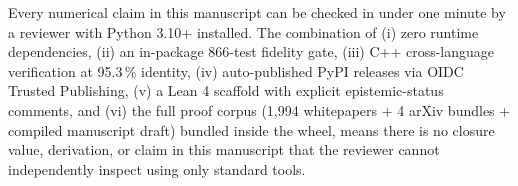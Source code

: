 Every numerical claim in this manuscript can be checked in under one
minute by a reviewer with Python 3.10+ installed. The combination of
(i) zero runtime dependencies, (ii) an in-package 866-test fidelity
gate, (iii) C++ cross-language verification at 95.3\,\% identity,
(iv) auto-published PyPI releases via OIDC Trusted Publishing,
(v) a Lean 4 scaffold with explicit epistemic-status comments, and
(vi) the full proof corpus (1{,}994 whitepapers + 4 arXiv bundles
+ compiled manuscript draft) bundled inside the wheel, means there
is no closure value, derivation, or claim in this manuscript that
the reviewer cannot independently inspect using only standard tools.

